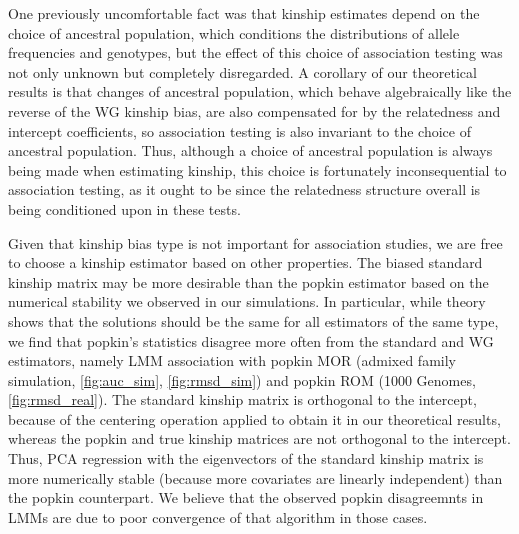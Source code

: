 \documentclass[11pt]{article}
\begin{document}
One previously uncomfortable fact was that kinship estimates depend on the choice of ancestral population, which conditions the distributions of allele frequencies and genotypes, but the effect of this choice of association testing was not only unknown but completely disregarded.
A corollary of our theoretical results is that changes of ancestral population, which behave algebraically like the reverse of the WG kinship bias, are also compensated for by the relatedness and intercept coefficients, so association testing is also invariant to the choice of ancestral population.
Thus, although a choice of ancestral population is always being made when estimating kinship, this choice is fortunately inconsequential to association testing, as it ought to be since the relatedness structure overall is being conditioned upon in these tests.

Given that kinship bias type is not important for association studies, we are free to choose a kinship estimator based on other properties.
The biased standard kinship matrix may be more desirable than the popkin estimator based on the numerical stability we observed in our simulations.
In particular, while theory shows that the solutions should be the same for all estimators of the same type, we find that popkin's statistics disagree more often from the standard and WG estimators, namely LMM association with popkin MOR (admixed family simulation, \cref{fig:auc_sim}, \cref{fig:rmsd_sim}) and popkin ROM (1000 Genomes, \cref{fig:rmsd_real}).
The standard kinship matrix is orthogonal to the intercept, because of the centering operation applied to obtain it in our theoretical results, whereas the popkin and true kinship matrices are not orthogonal to the intercept.
Thus, PCA regression with the eigenvectors of the standard kinship matrix is more numerically stable (because more covariates are linearly independent) than the popkin counterpart.
We believe that the observed popkin disagreemnts in LMMs are due to poor convergence of that algorithm in those cases.
\end{document}
